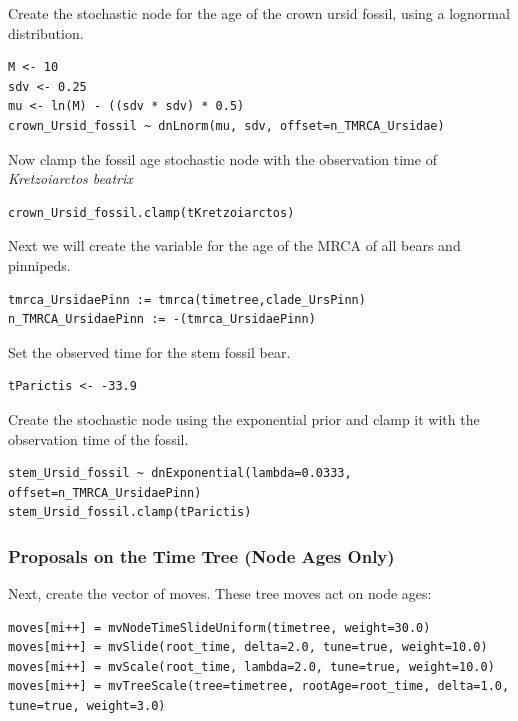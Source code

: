 Create the stochastic node for the age of the crown ursid fossil, using a lognormal distribution.
{\tt \begin{snugshade*}
\begin{lstlisting}
M <- 10
sdv <- 0.25
mu <- ln(M) - ((sdv * sdv) * 0.5)
crown_Ursid_fossil ~ dnLnorm(mu, sdv, offset=n_TMRCA_Ursidae)
\end{lstlisting}
\end{snugshade*}}

Now clamp the fossil age stochastic node with the observation time of \textit{Kretzoiarctos beatrix}
{\tt \begin{snugshade*}
\begin{lstlisting}
crown_Ursid_fossil.clamp(tKretzoiarctos)
\end{lstlisting}
\end{snugshade*}}

Next we will create the variable for the age of the MRCA of all bears and pinnipeds.
{\tt \begin{snugshade*}
\begin{lstlisting}
tmrca_UrsidaePinn := tmrca(timetree,clade_UrsPinn)
n_TMRCA_UrsidaePinn := -(tmrca_UrsidaePinn)
\end{lstlisting}
\end{snugshade*}}

Set the observed time for the stem fossil bear.
{\tt \begin{snugshade*}
\begin{lstlisting}
tParictis <- -33.9
\end{lstlisting}
\end{snugshade*}}

Create the stochastic node using the exponential prior and clamp it with the observation time of the fossil.
{\tt \begin{snugshade*}
\begin{lstlisting}
stem_Ursid_fossil ~ dnExponential(lambda=0.0333, offset=n_TMRCA_UrsidaePinn)
stem_Ursid_fossil.clamp(tParictis)
\end{lstlisting}
\end{snugshade*}}

\subsubsection{Proposals on the Time Tree (Node Ages Only)}

Next, create the vector of moves. These tree moves act on node ages:
{\tt \begin{snugshade*}
\begin{lstlisting}
moves[mi++] = mvNodeTimeSlideUniform(timetree, weight=30.0)
moves[mi++] = mvSlide(root_time, delta=2.0, tune=true, weight=10.0)
moves[mi++] = mvScale(root_time, lambda=2.0, tune=true, weight=10.0)
moves[mi++] = mvTreeScale(tree=timetree, rootAge=root_time, delta=1.0, tune=true, weight=3.0)
\end{lstlisting}
\end{snugshade*}}

